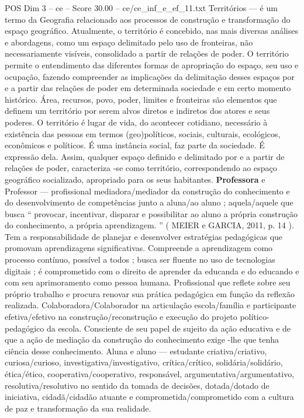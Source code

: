 \begin{textsample}{POS Dim 3 – ce – Score 30.00 – ce/ce\_inf\_e\_ef\_11.txt}
Territórios — é um termo da Geografia relacionado aos processos de construção e transformação do espaço geográfico.
Atualmente, o território é concebido, nas mais diversas análises e abordagens, como um espaço delimitado pelo uso de fronteiras, não necessariamente visíveis, consolidado a partir de relações de poder.
O território permite o entendimento das diferentes formas de apropriação do espaço, seu uso e ocupação, fazendo compreender as implicações da delimitação desses espaços por e a partir das relações de poder em determinada sociedade e em certo momento histórico.
Área, recursos, povo, poder, limites e fronteiras são elementos que definem um território por serem alvos diretos e indiretos dos atores e seus poderes.
O território é lugar de vida, do acontecer cotidiano, necessário à existência das pessoas em termos (geo)políticos, sociais, culturais, ecológicos, econômicos e políticos.
É uma instância social, faz parte da sociedade.
É expressão dela.
Assim, qualquer espaço definido e delimitado por e a partir de relações de poder, caracteriza -se como território, correspondendo ao espaço geográfico socializado, apropriado para os seus habitantes. \textbf{Professora} e Professor — profissional mediadora/mediador da construção do conhecimento e do desenvolvimento de competências junto a aluna/ao aluno ; aquela/aquele que busca “ provocar, incentivar, disparar e possibilitar ao aluno a própria construção do conhecimento, a própria aprendizagem. ” ( MEIER e GARCIA, 2011, p. 14 ).
Tem a responsabilidade de planejar e desenvolver estratégias pedagógicas que promovam aprendizagens significativas.
Compreende a aprendizagem como processo contínuo, possível a todos ; busca ser fluente no uso de tecnologias digitais ; é comprometido com o direito de aprender da educanda e do educando e com seu aprimoramento como pessoa humana.
Profissional que reflete sobre seu próprio trabalho e procura renovar sua prática pedagógica em função da reflexão realizada.
Colaboradora/Colaborador na articulação escola/família e participante efetiva/efetivo na construção/reconstrução e execução do projeto político-pedagógico da escola.
Consciente de seu papel de sujeito da ação educativa e de que a ação de mediação da construção do conhecimento exige -lhe que tenha ciência desse conhecimento.
Aluna e aluno — estudante criativa/criativo, curiosa/curioso, investigativa/investigativo, crítica/crítico, solidária/solidário, ética/ético, cooperativa/cooperativo, responsável, argumentativa/argumentativo, resolutiva/resolutivo no sentido da tomada de decisões, dotada/dotado de iniciativa, cidadã/cidadão atuante e comprometida/comprometido com a cultura de paz e transformação da sua realidade.

\end{textsample}
